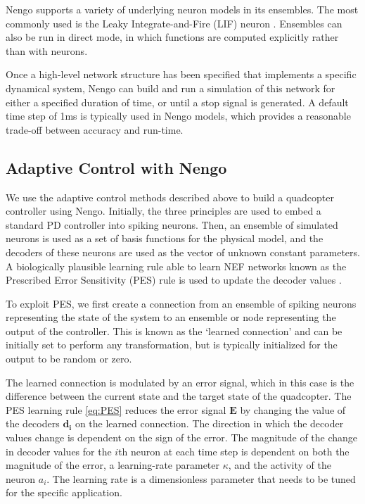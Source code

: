 \documentclass[letterpaper, 10 pt, conference]{ieeeconf}  %
\begin{document}
Nengo supports a variety of underlying neuron models in its ensembles.
The most commonly used is the Leaky Integrate-and-Fire (LIF) neuron \cite{burkitt2006review}.
Ensembles can also be run in direct mode, in which functions are computed explicitly rather than with neurons.

Once a high-level network structure has been specified that implements a specific dynamical system, Nengo can build and run a simulation of this network for either a specified duration of time, or until a stop signal is generated. 
A default time step of 1ms is typically used in Nengo models, which provides a reasonable trade-off between accuracy and run-time.

\subsection{Adaptive Control with Nengo}

We use the adaptive control methods described above to build a quadcopter controller using Nengo.
Initially, the three principles are used to embed a standard PD controller into spiking neurons.
Then, an ensemble of simulated neurons is used as a set of basis functions for the physical model, and the decoders of these neurons are used as the vector of unknown constant parameters.
A biologically plausible learning rule able to learn NEF networks known as the Prescribed Error Sensitivity (PES) rule is used to update the decoder values \cite{bekolay2013simultaneous}. 

To exploit PES, we first create a connection from an ensemble of spiking neurons representing the state of the system to an ensemble or node representing the output of the controller. 
This is known as the `learned connection' and can be initially set to perform any transformation, but is typically initialized for the output to be random or zero.

The learned connection is modulated by an error signal, which in this case is the difference between the current state and the target state of the quadcopter.
The PES learning rule \eqref{eq:PES} reduces the error signal $\bm{E}$ by changing the value of the decoders $\bm{d_{i}}$ on the learned connection. 
The direction in which the decoder values change is dependent on the sign of the error. 
The magnitude of the change in decoder values for the $i$th neuron at each time step is dependent on both the magnitude of the error, a learning-rate parameter $\kappa$, and the activity of the neuron $a_{i}$. 
The learning rate is a dimensionless parameter that needs to be tuned for the specific application. 
\end{document}
